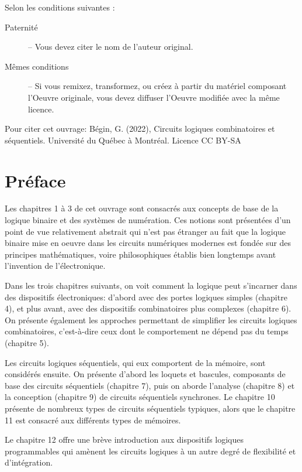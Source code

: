 \documentclass[11pt]{article}
\begin{document}
Selon les conditions suivantes :

\begin{description}
\item[{Paternité}] – Vous devez citer le nom de l’auteur original.
\item[{Mêmes conditions}] – Si vous remixez, transformez, ou créez à
partir du matériel composant l'Oeuvre originale, vous devez diffuser
l'Oeuvre modifiée avec la même licence.
\end{description}


Pour citer cet ouvrage: Bégin, G. (2022), Circuits logiques
combinatoires et séquentiels. Université du Québec à Montréal. Licence CC BY-SA

\begin{center}

\end{center}

\section*{Préface}
\label{sec:org08d676b}
Les chapitres 1 à 3 de cet ouvrage sont consacrés aux concepts de base
de la logique binaire et des systèmes de numération. Ces notions sont
présentées d'un point de vue relativement abstrait qui n'est pas
étranger au fait que la logique binaire mise en oeuvre dans les
circuits numériques modernes est fondée sur des principes
mathématiques, voire philosophiques établis bien longtemps avant
l'invention de l'électronique.

Dans les trois chapitres suivants, on voit comment la logique peut
s'incarner dans des dispositifs électroniques: d'abord avec des portes
logiques simples (chapitre 4), et plus avant, avec des dispositifs
combinatoires plus complexes (chapitre 6). On présente également les
approches permettant de simplifier les circuits logiques
combinatoires, c'est-à-dire ceux dont le comportement ne dépend pas du
temps (chapitre 5).

Les circuits logiques séquentiels, qui eux comportent de la
mémoire, sont considérés ensuite. On présente d'abord les loquets et
bascules, composants de base des circuits séquentiels (chapitre 7),
puis on aborde l'analyse (chapitre 8) et la conception (chapitre 9) de
circuits séquentiels synchrones. Le chapitre 10 présente de nombreux
types de circuits séquentiels typiques, alors que le chapitre 11 est
consacré aux différents types de mémoires.

Le chapitre 12 offre une brève introduction aux dispositifs logiques
programmables qui amènent les circuits logiques à un autre degré de
flexibilité et d'intégration.
\end{document}
